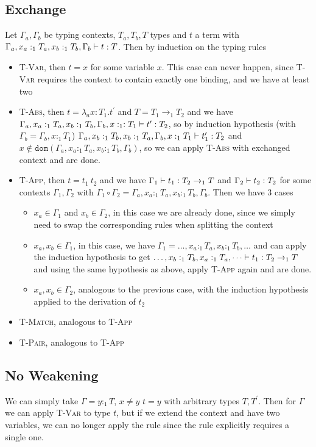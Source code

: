 \documentclass{article}
\newcommand{\typeinf}[3]{\ensuremath#1\vdash#2:#3}
\begin{document}
\subsection{Exchange}
Let $\Gamma_a,\Gamma_b$ be typing contexts, $T_a,T_b,T$ types and $t$ a term with $\typeinf{\Gamma_a,x_a:_1T_a,x_b:_1T_b,\Gamma_b}{t}{T}$. 
Then by induction on the typing rules 
\begin{itemize}
\item \textsc{T-Var}, then $t=x$ for some variable $x$. This case can never happen, since \textsc{T-Var} requires the context to contain exactly one binding, and we have at least two 
\item \textsc{T-Abs}, then $t=\lambda_a x:T_1.t^{\prime}$ and $T=T_1\rightarrow_1 T_2$ and we have $\typeinf{\Gamma_a,x_a:_1 T_a,x_b:_1 T_b,\Gamma_b,x:_1 :T_1}{t^{\prime}}{T_2}$, so by induction hypothesis (with $\Gamma_b = \Gamma_b,x:_1T_1$) $\typeinf{\Gamma_a,x_b:_1T_b,x_b:_1T_a,\Gamma_b,x:_1T_1}{t_1^{\prime}}{T_2}$ and $x\notin \mathtt{dom}(\Gamma_a,x_a:_1T_a,x_b:_1T_b,\Gamma_b)$, so we can apply \textsc{T-Abs} with exchanged context and are done.
\item \textsc{T-App}, then $t = t_1\ t_2$ and we have $\typeinf{\Gamma_1}{t_1}{T_2\rightarrow_1 T}$ and $\typeinf{\Gamma_2}{t_2}{T_2}$ for some contexts $\Gamma_1,\Gamma_2$ with $\Gamma_1 \circ \Gamma_2 = \Gamma_a,x_a:_1T_a,x_b:_1T_b,\Gamma_b$.
Then we have 3 cases 
\begin{itemize}
\item $x_a \in \Gamma_1$ and $x_b\in\Gamma_2$, in this case we are already done, since we simply need to swap the corresponding rules when splitting the context
\item $x_a,x_b\in\Gamma_1$, in this case, we have $\Gamma_1 = \dots,x_a:_1T_a,x_b:_1T_b,\dots$ and can apply the induction hypothesis to get $\typeinf{\dots,x_b:_1T_b,x_a:_1T_a,\dots}{t_1}{T_2\rightarrow_1T}$ and using the same hypothesis as above, apply \textsc{T-App} again and are done.
\item $x_a,x_b\in\Gamma_2$, analogous to the previous case, with the induction hypothesis applied to the derivation of $t_2$
\end{itemize}
\item \textsc{T-Match}, analogous to \textsc{T-App}
\item \textsc{T-Pair}, analogous to \textsc{T-App}
\end{itemize}

\subsection{No Weakening}
We can simply take $\Gamma = y:_1T$, $x\neq y$ $t=y$ with arbitrary types $T,T^{\prime}$.
Then for $\Gamma$ we can apply \textsc{T-Var} to type $t$, but if we extend the context and have two variables, we can no longer apply the rule since the rule explicitly requires a single one.
\end{document}
